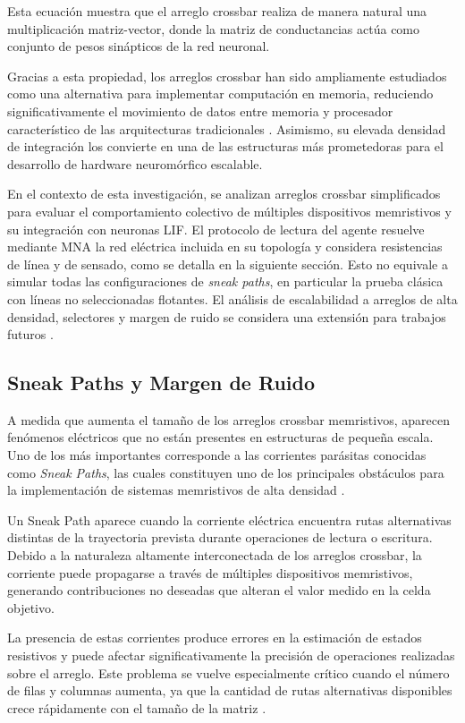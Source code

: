 Esta ecuación muestra que el arreglo crossbar realiza de manera natural una multiplicación matriz-vector, donde la matriz de conductancias actúa como conjunto de pesos sinápticos de la red neuronal.

Gracias a esta propiedad, los arreglos crossbar han sido ampliamente estudiados como una alternativa para implementar computación en memoria, reduciendo significativamente el movimiento de datos entre memoria y procesador característico de las arquitecturas tradicionales \cite{5}. Asimismo, su elevada densidad de integración los convierte en una de las estructuras más prometedoras para el desarrollo de hardware neuromórfico escalable.

En el contexto de esta investigación, se analizan arreglos crossbar
simplificados para evaluar el comportamiento colectivo de múltiples
dispositivos memristivos y su integración con neuronas LIF. El
protocolo de lectura del agente resuelve mediante MNA la red eléctrica
incluida en su topología y considera resistencias de línea y de
sensado, como se detalla en la siguiente sección. Esto no equivale a
simular todas las configuraciones de \textit{sneak paths}, en
particular la prueba clásica con líneas no seleccionadas flotantes.
El análisis de escalabilidad a arreglos de alta densidad, selectores y
margen de ruido se considera una extensión para trabajos futuros
\cite{7}.

\subsection{Sneak Paths y Margen de Ruido}

A medida que aumenta el tamaño de los arreglos crossbar memristivos, aparecen fenómenos eléctricos que no están presentes en estructuras de pequeña escala. Uno de los más importantes corresponde a las corrientes parásitas conocidas como \textit{Sneak Paths}, las cuales constituyen uno de los principales obstáculos para la implementación de sistemas memristivos de alta densidad \cite{7}.

Un Sneak Path aparece cuando la corriente eléctrica encuentra rutas alternativas distintas de la trayectoria prevista durante operaciones de lectura o escritura. Debido a la naturaleza altamente interconectada de los arreglos crossbar, la corriente puede propagarse a través de múltiples dispositivos memristivos, generando contribuciones no deseadas que alteran el valor medido en la celda objetivo.

La presencia de estas corrientes produce errores en la estimación de estados resistivos y puede afectar significativamente la precisión de operaciones realizadas sobre el arreglo. Este problema se vuelve especialmente crítico cuando el número de filas y columnas aumenta, ya que la cantidad de rutas alternativas disponibles crece rápidamente con el tamaño de la matriz \cite{7}.

